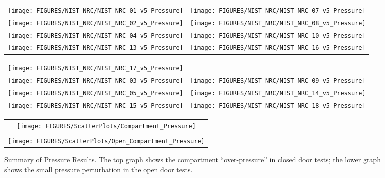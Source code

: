 \begin{figure}[p]
\begin{tabular*}{\textwidth}{l@{\extracolsep{\fill}}r}
\texttt{[image: FIGURES/NIST\_NRC/NIST\_NRC\_01\_v5\_Pressure]} &
\texttt{[image: FIGURES/NIST\_NRC/NIST\_NRC\_07\_v5\_Pressure]} \\
\texttt{[image: FIGURES/NIST\_NRC/NIST\_NRC\_02\_v5\_Pressure]} &
\texttt{[image: FIGURES/NIST\_NRC/NIST\_NRC\_08\_v5\_Pressure]} \\
\texttt{[image: FIGURES/NIST\_NRC/NIST\_NRC\_04\_v5\_Pressure]} &
\texttt{[image: FIGURES/NIST\_NRC/NIST\_NRC\_10\_v5\_Pressure]} \\
\texttt{[image: FIGURES/NIST\_NRC/NIST\_NRC\_13\_v5\_Pressure]} &
\texttt{[image: FIGURES/NIST\_NRC/NIST\_NRC\_16\_v5\_Pressure]}
\end{tabular*}
\label{NIST_NRC_Pressure_Closed}
\end{figure}

\begin{figure}[p]
\begin{tabular*}{\textwidth}{l@{\extracolsep{\fill}}r}
\texttt{[image: FIGURES/NIST\_NRC/NIST\_NRC\_17\_v5\_Pressure]} &
   \\
\texttt{[image: FIGURES/NIST\_NRC/NIST\_NRC\_03\_v5\_Pressure]} &
\texttt{[image: FIGURES/NIST\_NRC/NIST\_NRC\_09\_v5\_Pressure]} \\
\texttt{[image: FIGURES/NIST\_NRC/NIST\_NRC\_05\_v5\_Pressure]} &
\texttt{[image: FIGURES/NIST\_NRC/NIST\_NRC\_14\_v5\_Pressure]} \\
\texttt{[image: FIGURES/NIST\_NRC/NIST\_NRC\_15\_v5\_Pressure]} &
\texttt{[image: FIGURES/NIST\_NRC/NIST\_NRC\_18\_v5\_Pressure]}
\end{tabular*}
\label{NIST_NRC_Pressure_Open}
\end{figure}

\begin{figure}[p]
\begin{center}
\begin{tabular}{c}
\texttt{[image: FIGURES/ScatterPlots/Compartment\_Pressure]} \\
\vspace{0.25in} \\
\texttt{[image: FIGURES/ScatterPlots/Open\_Compartment\_Pressure]}
\end{tabular}
\end{center}
\caption[Summary of pressure predictions, NIST/NRC test series.]
{Summary of Pressure Results. The top graph shows the compartment ``over-pressure'' in closed door tests; the lower graph
shows the small pressure perturbation in the open door tests.}
\end{figure}
